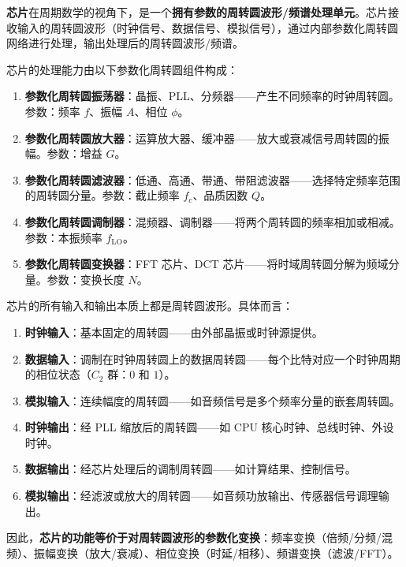 \begin{definition}[芯片的周转圆处理模型]\label{def:chip_epicycle_model}
\textbf{芯片}在周期数学的视角下，是一个\textbf{拥有参数的周转圆波形/频谱处理单元}。芯片接收输入的周转圆波形（时钟信号、数据信号、模拟信号），通过内部参数化周转圆网络进行处理，输出处理后的周转圆波形/频谱。

芯片的处理能力由以下参数化周转圆组件构成：
\begin{enumerate}[label=(\roman*)]
    \item \textbf{参数化周转圆振荡器}：晶振、PLL、分频器——产生不同频率的时钟周转圆。参数：频率 $f$、振幅 $A$、相位 $\phi$。
    \item \textbf{参数化周转圆放大器}：运算放大器、缓冲器——放大或衰减信号周转圆的振幅。参数：增益 $G$。
    \item \textbf{参数化周转圆滤波器}：低通、高通、带通、带阻滤波器——选择特定频率范围的周转圆分量。参数：截止频率 $f_c$、品质因数 $Q$。
    \item \textbf{参数化周转圆调制器}：混频器、调制器——将两个周转圆的频率相加或相减。参数：本振频率 $f_{\text{LO}}$。
    \item \textbf{参数化周转圆变换器}：FFT 芯片、DCT 芯片——将时域周转圆分解为频域分量。参数：变换长度 $N$。
\end{enumerate}
\end{definition}

\begin{proposition}[芯片的输入输出都是周转圆]\label{prop:chip_io_epicycle}
芯片的所有输入和输出本质上都是周转圆波形。具体而言：
\begin{enumerate}[label=(\roman*)]
    \item \textbf{时钟输入}：基本固定的周转圆——由外部晶振或时钟源提供。
    \item \textbf{数据输入}：调制在时钟周转圆上的数据周转圆——每个比特对应一个时钟周期的相位状态（$C_2$ 群：$0$ 和 $1$）。
    \item \textbf{模拟输入}：连续幅度的周转圆——如音频信号是多个频率分量的嵌套周转圆。
    \item \textbf{时钟输出}：经 PLL 缩放后的周转圆——如 CPU 核心时钟、总线时钟、外设时钟。
    \item \textbf{数据输出}：经芯片处理后的调制周转圆——如计算结果、控制信号。
    \item \textbf{模拟输出}：经滤波或放大的周转圆——如音频功放输出、传感器信号调理输出。
\end{enumerate}
因此，\textbf{芯片的功能等价于对周转圆波形的参数化变换}：频率变换（倍频/分频/混频）、振幅变换（放大/衰减）、相位变换（时延/相移）、频谱变换（滤波/FFT）。
\end{proposition}

